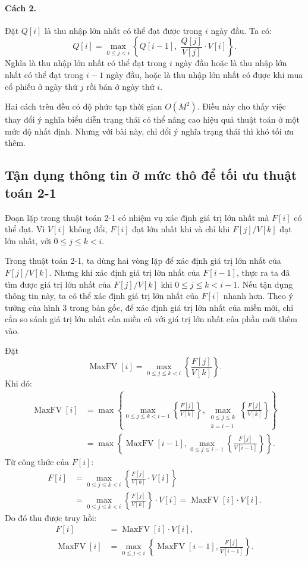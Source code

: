 \documentclass[11pt]{article}
\begin{document}
\paragraph{Cách 2.}
Đặt \(Q[i]\) là thu nhập lớn nhất có thể đạt được trong \(i\) ngày đầu. Ta có:
\[
  Q[i] = \max_{0\le j<i}\left\{ Q[i-1],\; \frac{Q[j]}{V[j]}\cdot V[i]\right\}.
\]
Nghĩa là thu nhập lớn nhất có thể đạt trong \(i\) ngày đầu hoặc là thu nhập
lớn nhất có thể đạt trong \(i-1\) ngày đầu, hoặc là thu nhập lớn nhất có được
khi mua cổ phiếu ở ngày thứ \(j\) rồi bán ở ngày thứ \(i\).

Hai cách trên đều có độ phức tạp thời gian \(O(M^2)\). Điều này cho thấy việc
thay đổi ý nghĩa biểu diễn trạng thái có thể nâng cao hiệu quả thuật toán ở
một mức độ nhất định. Nhưng với bài này, chỉ đổi ý nghĩa trạng thái thì khó
tối ưu thêm.

\subsection{Tận dụng thông tin ở mức thô để tối ưu thuật toán 2-1}

Đoạn lặp trong thuật toán 2-1 có nhiệm vụ xác định giá trị lớn nhất mà \(F[i]\)
có thể đạt. Vì \(V[i]\) không đổi, \(F[i]\) đạt lớn nhất khi và chỉ khi
\(F[j]/V[k]\) đạt lớn nhất, với \(0\le j\le k<i\).

Trong thuật toán 2-1, ta dùng hai vòng lặp để xác định giá trị lớn nhất của
\(F[j]/V[k]\). Nhưng khi xác định giá trị lớn nhất của \(F[i-1]\), thực ra ta
đã tìm được giá trị lớn nhất của \(F[j]/V[k]\) khi \(0\le j\le k<i-1\). Nếu
tận dụng thông tin này, ta có thể xác định giá trị lớn nhất của \(F[i]\)
nhanh hơn. Theo ý tưởng của hình 3 trong bản gốc, để xác định giá trị lớn
nhất của miền mới, chỉ cần so sánh giá trị lớn nhất của miền cũ với giá trị
lớn nhất của phần mới thêm vào.

Đặt
\[
  \operatorname{MaxFV}[i]=
  \max_{0\le j\le k<i}\left\{\frac{F[j]}{V[k]}\right\}.
\]
Khi đó:
\[
\begin{aligned}
\operatorname{MaxFV}[i]
&= \max\left\{
    \max_{0\le j\le k<i-1}\left\{\frac{F[j]}{V[k]}\right\},
    \max_{\substack{0\le j\le k\\ k=i-1}}\left\{\frac{F[j]}{V[k]}\right\}
  \right\}\\
&= \max\left\{\operatorname{MaxFV}[i-1],
    \max_{0\le j\le i-1}\left\{\frac{F[j]}{V[i-1]}\right\}\right\}.
\end{aligned}
\]
Từ công thức của \(F[i]\):
\[
\begin{aligned}
F[i]
&= \max_{0\le j\le k<i}\left\{\frac{F[j]}{V[k]}\cdot V[i]\right\}\\
&= \max_{0\le j\le k<i}\left\{\frac{F[j]}{V[k]}\right\}\cdot V[i]
 = \operatorname{MaxFV}[i]\cdot V[i].
\end{aligned}
\]
Do đó thu được truy hồi:
\[
\begin{aligned}
F[i] &= \operatorname{MaxFV}[i]\cdot V[i],\\
\operatorname{MaxFV}[i] &=
  \max_{0\le j<i}\left\{\operatorname{MaxFV}[i-1],
  \frac{F[j]}{V[i-1]}\right\}.
\end{aligned}
\]
\end{document}
